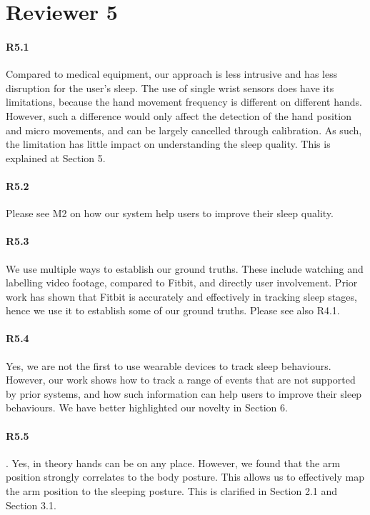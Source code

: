 \section*{Reviewer 5}

\paragraph{R5.1} Compared to medical equipment, our approach is less intrusive and has less disruption for the user's sleep. The use of
single wrist sensors does have its limitations, because the hand movement frequency is different on different hands. However, such a
difference would only affect the detection of the hand position and micro movements, and can be largely cancelled through calibration. As
such, the limitation has little impact on understanding the sleep quality. This is explained at Section 5.


\paragraph{R5.2} Please see M2 on how our system help users to improve their sleep quality.

\paragraph{R5.3} We use multiple ways to establish our ground truths. These include watching and labelling video footage, compared to
Fitbit, and directly user involvement. Prior work has shown that Fitbit is accurately and effectively in tracking sleep stages, hence we use it to
establish some of our ground truths. Please see also R4.1.

\paragraph{R5.4} Yes, we are not the first to use wearable devices to track sleep behaviours. However, our work shows how
 to track a range of events that are not supported by prior systems, and how such information can help users to improve
their sleep behaviours. We have better highlighted our novelty in Section 6.

\paragraph{R5.5}. Yes, in theory hands can be on any place. However, we found that the arm position strongly correlates to the body
posture. This allows us to effectively map the arm position to the sleeping posture. This is clarified in Section 2.1 and Section 3.1.


